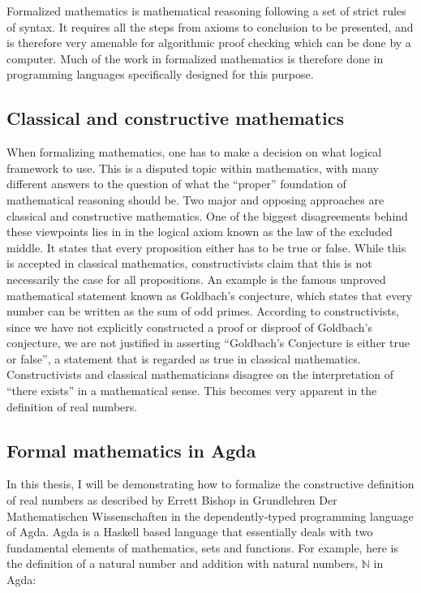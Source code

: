 \documentclass[11pt,a4paper]{article}
\begin{document}
Formalized mathematics is mathematical reasoning following a set of strict rules of syntax. It requires all the steps from axioms to conclusion to be presented, and is therefore very amenable for algorithmic proof checking which can be done by a computer. Much of the work in formalized mathematics is therefore done in programming languages specifically designed for this purpose.\\

\subsection{Classical and constructive mathematics}
When formalizing mathematics, one has to make a decision on what logical framework to use. This is a disputed topic within mathematics, with many different answers to the question of what the ``proper'' foundation of mathematical reasoning should be. Two major and opposing approaches are classical and constructive mathematics. One of the biggest disagreements behind these viewpoints lies in in the logical axiom known as the law of the excluded middle. It states that every proposition either has to be true or false. While this is accepted in classical mathematics, constructivists claim that this is not necessarily the case for all propositions. An example is the famous unproved mathematical statement known as Goldbach's conjecture, which states that every number can be written as the sum of odd primes. According to constructivists, since we have not explicitly constructed a proof or disproof of Goldbach's conjecture, we are not justified in asserting ``Goldbach's Conjecture is either true or false'', a statement that is regarded as true in classical mathematics. \\
Constructivists and classical mathematicians disagree on the interpretation of ``there exists'' in a mathematical sense. This becomes very apparent in the definition of real numbers. 

\subsection{Formal mathematics in Agda}\label{subsec: Agda}
In this thesis, I will be demonstrating how to formalize the constructive definition of real numbers as described by Errett Bishop in Grundlehren Der Mathematischen Wissenschaften \cite{bishop:67} in the dependently-typed programming language of Agda. Agda is a Haskell based language that essentially deals with two fundamental elements of mathematics, sets and functions. For example, here is the definition of a natural number and addition with natural numbers, $\mathbb{N}$ in Agda:\\
\end{document}
